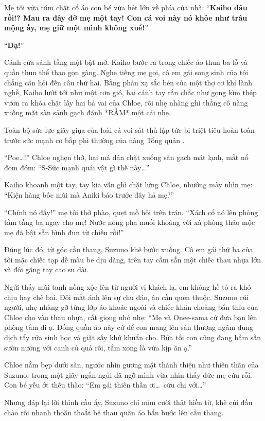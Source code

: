\documentclass[../main.tex]{subfiles}
\begin{document}
Mẹ tôi vừa túm chặt cổ áo con bé vừa hét lớn về phía cửa nhà: ``\textbf{Kaiho đâu rồi!? Mau ra đây đỡ mẹ một tay! Con cá voi này nó khỏe như trâu mộng ấy, mẹ giữ một mình không xuể!}''

``\textbf{Dạ!}''

Cánh cửa sảnh tầng một bật mở. Kaiho bước ra trong chiếc áo thun ba lỗ và quần thun thể thao gọn gàng. Nghe tiếng mẹ gọi, cô em gái song sinh của tôi chẳng cần hỏi đến câu thứ hai. Bằng phản xạ sắc bén của một thợ cơ khí lành nghề, Kaiho lướt tới như một cơn gió, hai cánh tay rắn chắc như gọng kìm thép vươn ra khóa chặt lấy hai bả vai của Chloe, rồi nhẹ nhàng ghì thẳng cô nàng xuống mặt sàn sảnh gạch đánh *RẦM* một cái nhẹ.

Toàn bộ sức lực giãy giụa của loài cá voi sát thủ lập tức bị triệt tiêu hoàn toàn trước sức mạnh cơ bắp phi thường của nàng Tổng quản \hls.

``Poe\dots!'' Chloe nghẹn thở, hai má dán chặt xuống sàn gạch mát lạnh, mắt nổ đom đóm: ``S-Sức mạnh quái vật gì thế này\dots''

Kaiho khoanh một tay, tay kia vẫn ghì chặt lưng Chloe, nhướng mày nhìn mẹ: ``Kiện hàng bốc mùi mà Aniki báo trước đây hả mẹ?''

``Chính nó đấy!'' mẹ tôi thở phào, quẹt mồ hôi trên trán. ``Xách cổ nó lên phòng tắm tầng ba ngay cho mẹ! Nước nóng pha muối khoáng với xà phòng thảo mộc mẹ đã bật sẵn bình đun từ chiều rồi!''

Đúng lúc đó, từ góc cầu thang, Suzuno khẽ bước xuống. Cô em gái thứ ba của tôi mặc chiếc tạp dề màu be dịu dàng, trên tay cầm sẵn một chiếc thau nhựa lớn và đôi găng tay cao su dài.

Ngửi thấy mùi tanh nồng xộc lên từ người vị khách lạ, em không hề tỏ ra khó chịu hay chê bai. Đôi mắt ánh lên sự chu đáo, ân cần quen thuộc. Suzuno cúi người, nhẹ nhàng gỡ từng lớp áo khoác ngoài và chiếc khăn choàng bẩn thỉu của Chloe cho vào thau nhựa, cất giọng nhỏ nhẹ: ``Mẹ và Onee-sama cứ đưa bạn lên phòng tắm đi ạ. Đống quần áo này cứ để con mang lên sân thượng ngâm dung dịch tẩy rửa sinh học và giặt sấy khử khuẩn cho. Bữa tối con cũng đang hầm sẵn sườn nướng với canh củ quả rồi, tắm xong là vừa kịp ăn ạ.''

Chloe nằm bẹp dưới sàn, ngước nhìn gương mặt thánh thiện như thiên thần của Suzuno, trong một giây ngắn ngủi đã ngỡ mình vừa nhìn thấy đức mẹ cứu rỗi. Con bé yếu ớt thều thào: ``Em gái thiên thần ơi\dots\ cứu chị với\dots''

Nhưng đáp lại lời thỉnh cầu ấy, Suzuno chỉ mỉm cười thật hiền từ, khẽ cúi đầu chào rồi nhanh thoăn thoắt bê thau quần áo bẩn bước lên cầu thang.
\end{document}
